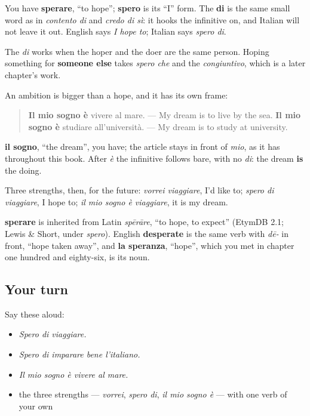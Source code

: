 You have \textbf{sperare}, \textquotedblleft{}to hope\textquotedblright{}; \textbf{spero} is its \textquotedblleft{}I\textquotedblright{} form. The \textbf{di} is the same small word as in \emph{contento di} and \emph{credo di sì}: it hooks the infinitive on, and Italian will not leave it out. English says \emph{I hope to}; Italian says \emph{spero di}.

The \emph{di} works when the hoper and the doer are the same person. Hoping something for \textbf{someone else} takes \emph{spero che} and the \emph{congiuntivo}, which is a later chapter's work.

\begin{grammarlens}[title={Grammar Lens: il mio sogno è}]
An ambition is bigger than a hope, and it has its own frame:

\begin{quote}
\textbf{Il mio sogno è} vivere al mare. — My dream is to live by the sea. \textbf{Il mio sogno è} studiare all'università. — My dream is to study at university.
\end{quote}

\textbf{il sogno}, \textquotedblleft{}the dream\textquotedblright{}, you have; the article stays in front of \emph{mio}, as it has throughout this book. After \emph{è} the infinitive follows bare, with no \emph{di}: the dream \textbf{is} the doing.

Three strengths, then, for the future: \emph{vorrei viaggiare}, I'd like to; \emph{spero di viaggiare}, I hope to; \emph{il mio sogno è viaggiare}, it is my dream.
\end{grammarlens}

\begin{cousinweb}
\textbf{sperare} is inherited from Latin \emph{spērāre}, \textquotedblleft{}to hope, to expect\textquotedblright{} (EtymDB 2.1; Lewis \& Short, under \emph{spero}). English \textbf{desperate} is the same verb with \emph{dē-} in front, \textquotedblleft{}hope taken away\textquotedblright{}, and \textbf{la speranza}, \textquotedblleft{}hope\textquotedblright{}, which you met in chapter one hundred and eighty-six, is its noun.
\end{cousinweb}

\subsection*{Your turn}
Say these aloud:

\begin{itemize}
\raggedright
  \item \emph{Spero di viaggiare.}
  \item \emph{Spero di imparare bene l'italiano.}
  \item \emph{Il mio sogno è vivere al mare.}
  \item the three strengths — \emph{vorrei}, \emph{spero di}, \emph{il mio sogno è} — with one verb of your own
\end{itemize}

